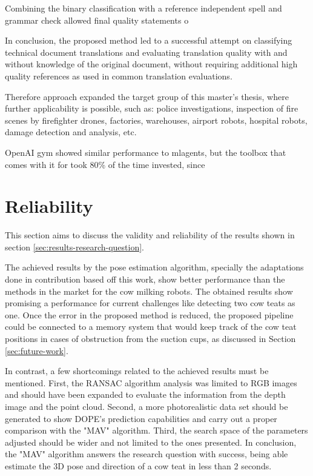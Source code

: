     
    Combining the binary classiﬁcation with a reference independent spell and grammar
    check allowed ﬁnal quality statements o
    
    
    In conclusion, the proposed method led to a successful attempt on classifying technical
    document translations and evaluating translation quality with and without knowledge of
    the original document, without requiring additional high quality references as used in
    common translation evaluations.

        Therefore approach expanded the target group of this master's thesis, where further applicability is possible, such as: police investigations, inspection of fire scenes by firefighter drones, factories, warehouses, airport robots, hospital robots, damage detection and analysis, etc. 
        
    
        OpenAI gym showed similar performance to mlagents, but the toolbox that comes with it for 
        took 80\% of the time invested, since     

\section{Reliability}\label{sec:results-reliability}
    This section aims to discuss the validity and reliability of the results shown in section \ref{sec:results-research-question}.
    
    The achieved results by the pose estimation algorithm, specially the adaptations done in contribution based off this work, show better performance than the methods in the market for the cow milking robots. The obtained results show promising a performance for current challenges like detecting two cow teats as one. Once the error in the proposed method is reduced, the proposed pipeline could be connected to a memory system that would keep track of the cow teat positions in cases of obstruction from the suction cups, as discussed in Section \ref{sec:future-work}.
    
    In contrast, a few shortcomings related to the achieved results must be mentioned. First, the RANSAC algorithm analysis was limited to RGB images and should have been expanded to evaluate the information from the depth image and the point cloud. Second, a more photorealistic data set should be generated to show DOPE's prediction capabilities and carry out a proper comparison with the "MAV" algorithm. Third, the search space of the parameters adjusted should be wider and not limited to the ones presented. In conclusion, the "MAV" algorithm answers the research question with success, being able estimate the 3D pose and direction of a cow teat in less than 2 seconds.
    
